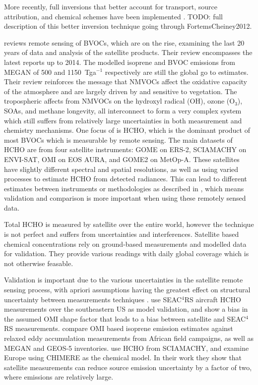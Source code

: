     More recently, full inversions that better account for transport, source attribution, and chemical schemes have been implemented \parencite{FortemsCheiney2012}.
    TODO: full description of this better inversion technique going through FortemsCheiney2012.
    
    \textcite{Kefauver2014} reviews remote sensing of BVOCs, which are on the rise, examining the last 20 years of data and analysis of the satellite products.
    Their review encompasses the latest reports up to 2014.
    The modelled isoprene and BVOC emissions from MEGAN \parencite{Guenther2000} of 500 and 1150~Tga$^{-1}$ respectively are still the global go to estimates.
    Their review reinforces the message that NMVOCs affect the oxidative capacity of the atmosphere and are largely driven by and sensitive to vegetation.
    The tropospheric affects from NMVOCs on the hydroxyl radical (OH), ozone (O$_3$), SOAs, and methane longevity, all interconnect to form a very complex system which still suffers from relatively large uncertainties in both measurement and chemistry mechanisms.
    One focus of \textcite{Kefauver2014} is HCHO, which is the dominant product of most BVOCs which is measurable by remote sensing.
    The main datasets of HCHO are from four satellite instruments: GOME on ERS-2, SCIAMACHY on ENVI-SAT, OMI on EOS AURA, and GOME2 on MetOp-A.
    These satellites have slightly different spectral and spatial resolutions, as well as using varied processes to estimate HCHO from detected radiances.
    This can lead to different estimates between instruments or methodologies as described in \textcite{Lorent2017}, which means validation and comparison is more important when using these remotely sensed data.
    
    Total HCHO is measured by satellite over the entire world, however the technique is not perfect and suffers from uncertainties and interferences.
    Satellite based chemical concentrations rely on ground-based measurements and modelled data for validation.
    They provide various readings with daily global coverage which is not otherwise feasable.
    
    Validation is important due to the various uncertainties in the satellite remote sensing process, with apriori assumptions having the greatest effect on structural uncertainty between measurements techniques \textcite{Lorente2017}.
    \textcite{Zhu2016} use SEAC$^4$RS aircraft HCHO measurements over the southeastern US as model validation, and show a bias in the assumed OMI shape factor that leads to a bias between satellite and SEAC$^4$RS measurements.
    \textcite{Marais2014} compare OMI based isoprene emission estimates against relaxed eddy accumulation measurements from African field campaigns, as well as MEGAN and GEOS-5 inventories.
    \textcite{Dufour2009} use HCHO from SCIAMACHY, and examine Europe using CHIMERE as the chemical model. 
    In their work they show that satellite measurements can reduce source emission uncertainty by a factor of two, where emissions are relatively large.
    
